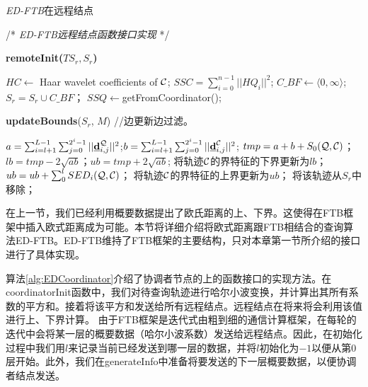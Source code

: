 \begin{algorithm}[t]
	\renewcommand{\baselinestretch}{1}
	\caption{{\sl ED-FTB}\label{alg:EDRemote}在远程结点}
	\begin{algorithmic}[2]
		\STATE /* \emph{ED-FTB远程结点函数接口实现} */
	\end{algorithmic}
	
	\textbf{remoteInit($TS_{r} , S_{r}$)}
	\begin{algorithmic}[1]
		\STATE $HC \leftarrow$ Haar wavelet coefficients of $\cal C$; 
		\STATE $SSC = \sum_{i=0}^{n-1}||HQ_{i}||^2$;	   
		\ENDFOR
		\ENDIF
		\STATE $C\_BF \leftarrow  \langle 0,\infty \rangle$; 
		\STATE $S_{r}=S_{r} \cup C\_BF$；
		\ENDFOR
		\STATE $SSQ \leftarrow$\textsf{getFromCoordinator}();
	\end{algorithmic}
	
	\textbf{updateBounds}($S_{r}$, $M$) //边更新边过滤。
	\begin{algorithmic}[1]
		\STATE  $a=\sum_{i=l+1}^{L-1}\sum_{j=0}^{2^i-1}||\emph{{\textbf{d}}}_{i,j}^{\cal Q}||^2$;$b=\sum_{i=l+1}^{L-1}\sum_{j=0}^{2^i-1}||\emph{{\textbf{d}}}_{i,j}^{\cal C}||^2$;
		\STATE $tmp=a+b+S_{0}(\cal Q, \cal C)$；
		\STATE $lb=tmp -2\sqrt{ab}$；$ub=tmp+2\sqrt{ab}$;
		\STATE 将轨迹$\cal C$的界特征的下界更新为$lb$；
		\STATE $ ub=ub+ \sum_{0}^{l}SED_{i}({\cal Q}, {\cal C})$；
		\STATE 将轨迹$\cal C$的界特征的上界更新为$ub$；
		\ENDIF
		\ELSE
		\STATE 将该轨迹从$S_{r}$中移除；
		\ENDIF
		\ENDFOR
	\end{algorithmic}
\end{algorithm}

在上一节，我们已经利用概要数据提出了欧氏距离的上、下界。这使得在FTB框架中插入欧式距离成为可能。本节将详细介绍将欧式距离跟FTB相结合的查询算法ED-FTB。ED-FTB维持了FTB框架的主要结构，只对本章第一节所介绍的接口进行了具体实现。

算法\ref{alg:EDCoordinator}介绍了协调者节点的上的函数接口的实现方法。在\textsf{coordinatorInit}函数中，我们对待查询轨迹进行哈尔小波变换，并计算出其所有系数的平方和。接着将该平方和发送给所有远程结点。远程结点在将来将会利用该值进行上、下界计算。
由于FTB框架是迭代式由粗到细的通信计算框架，在每轮的迭代中会将某一层的概要数据（哈尔小波系数）发送给远程结点。因此，在初始化过程中我们用$l$来记录当前已经发送到哪一层的数据，并将$l$初始化为$-1$以便从第0层开始。此外，我们在\textsf{generateInfo}中准备将要发送的下一层概要数据，以便协调者结点发送。

